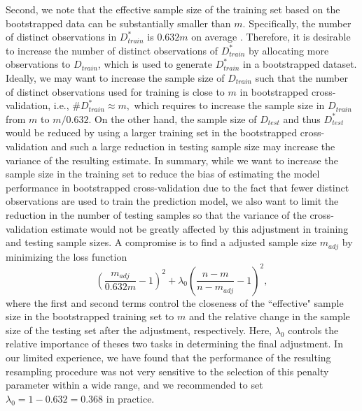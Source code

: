 \documentclass[12pt]{article}
\begin{document}
Second, we note that the effective sample size of the training set based on the bootstrapped data can be substantially smaller than $m$. Specifically, the number of distinct observations in $D_{train}^*$ is $0.632m$ on average \cite{efron1997improvements}.  Therefore, it is desirable to increase the number of distinct observations of $D_{train}^*$ by allocating more observations to $D_{train}$, which is used to generate $D_{train}^*$ in a bootstrapped dataset. Ideally, we may want to increase the sample size of $D_{train}$ such that the number of distinct observations used for training is close to $m$ in bootstrapped cross-validation, i.e., $\# D_{train}^*\approx m,$ which requires to increase the sample size in $D_{train}$ from $m$ to $m/0.632.$ On the other hand, the sample size of $D_{test}$ and thus $D_{test}^*$ would be reduced by using a larger training set in the bootstrapped cross-validation and such a large reduction in testing sample size may increase the variance of the resulting estimate. In summary, while we want to increase the sample size in the training set to reduce the bias of estimating the model performance in bootstrapped cross-validation due to the fact that fewer distinct observations are used to train the prediction model, we also want to limit the reduction in the number of testing samples so that the variance of the cross-validation estimate would not be greatly affected by this adjustment in training and testing sample sizes. A compromise is to find a adjusted sample size $m_{adj}$ by minimizing the loss function 
\begin{equation}
\left(\frac{m_{adj}}{0.632m}-1\right)^2+\lambda_0 \left(\frac{n-m}{n-m_{adj}}-1\right)^2,  \label{eq:sizeadj}
\end{equation}
where the first and second terms control the closeness of the ``effective" sample size in the bootstrapped training set to $m$ and the relative change in the sample size of the testing set after the adjustment, respectively. Here, $\lambda_0$ controls the relative importance of theses two tasks in determining the final adjustment. In our limited experience, we have found that the performance of the resulting resampling procedure was not very sensitive to the selection of this penalty parameter within a wide range, and we recommended to set $\lambda_0=1-0.632=0.368$ in practice. %
\end{document}
